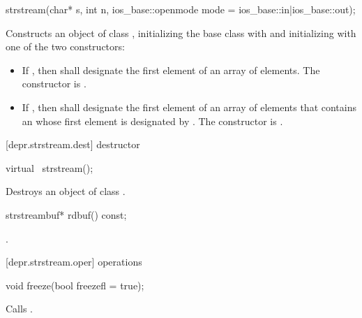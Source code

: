 %
\begin{itemdecl}
strstream(char* s, int n,
          ios_base::openmode mode = ios_base::in|ios_base::out);
\end{itemdecl}

\begin{itemdescr}
\pnum
\effects
Constructs an object of class
,
initializing the base class with
and initializing  with one of the two constructors:
\begin{itemize}
\item
If
,
then  shall designate the first element of an array of  elements.
The constructor is
.
\item
If
,
then  shall
designate the first element of an array of  elements that contains
an \ntbs whose first element is designated by .
The constructor is
.
%
\end{itemize}
\end{itemdescr}

[depr.strstream.dest]{ destructor}

%
\begin{itemdecl}
virtual ~strstream();
\end{itemdecl}

\begin{itemdescr}
\pnum
\effects
Destroys an object of class
.
\end{itemdescr}

%
\begin{itemdecl}
strstreambuf* rdbuf() const;
\end{itemdecl}

\begin{itemdescr}
\pnum
\returns
{}.
\end{itemdescr}

[depr.strstream.oper]{ operations}

%
\begin{itemdecl}
void freeze(bool freezefl = true);
\end{itemdecl}

\begin{itemdescr}
\pnum
\effects
Calls
.
\end{itemdescr}

